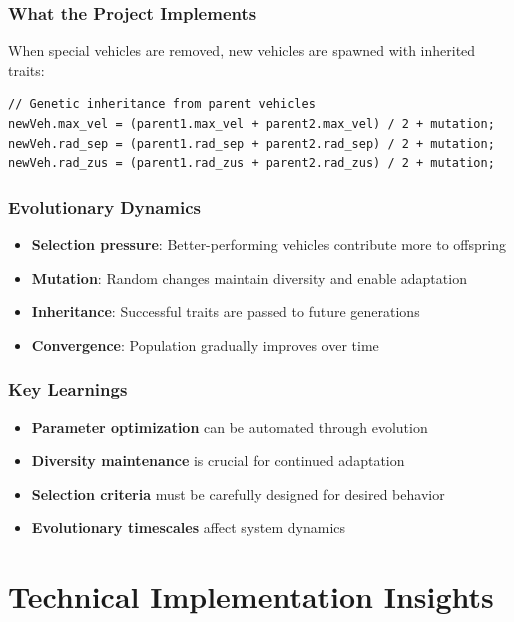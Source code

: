 \documentclass[12pt,a4paper]{article}
\begin{document}
\subsubsection{What the Project Implements}
When special vehicles are removed, new vehicles are spawned with inherited traits:

\begin{lstlisting}
// Genetic inheritance from parent vehicles
newVeh.max_vel = (parent1.max_vel + parent2.max_vel) / 2 + mutation;
newVeh.rad_sep = (parent1.rad_sep + parent2.rad_sep) / 2 + mutation;
newVeh.rad_zus = (parent1.rad_zus + parent2.rad_zus) / 2 + mutation;
\end{lstlisting}

\subsubsection{Evolutionary Dynamics}
\begin{itemize}
    \item \textbf{Selection pressure}: Better-performing vehicles contribute more to offspring
    \item \textbf{Mutation}: Random changes maintain diversity and enable adaptation
    \item \textbf{Inheritance}: Successful traits are passed to future generations
    \item \textbf{Convergence}: Population gradually improves over time
\end{itemize}

\subsubsection{Key Learnings}
\begin{itemize}
    \item \textbf{Parameter optimization} can be automated through evolution
    \item \textbf{Diversity maintenance} is crucial for continued adaptation
    \item \textbf{Selection criteria} must be carefully designed for desired behavior
    \item \textbf{Evolutionary timescales} affect system dynamics
\end{itemize}

\section{Technical Implementation Insights}
\end{document}
